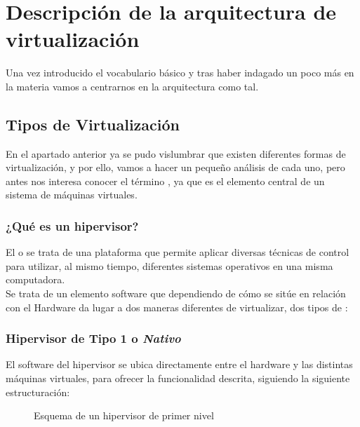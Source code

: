 \chapter[Descripción de la arquitectura]{Descripción de la arquitectura de virtualización}

\lettrine[lines=1,slope=4pt,findent=0pt]{U}{}na vez introducido el vocabulario básico y tras haber indagado un poco más en la materia vamos a centrarnos en la arquitectura como tal.\\

\section{Tipos de Virtualización}\label{tiposvir}
En el apartado anterior ya se pudo vislumbrar que existen diferentes formas de virtualización, y por ello, vamos a hacer un pequeño análisis de cada uno, pero antes nos interesa conocer el término \emph{}, ya que es el elemento central de un sistema de máquinas virtuales.

\subsection{¿Qué es un hipervisor?}
El \emph{} o \emph{} se trata de una plataforma que permite aplicar diversas técnicas de control para utilizar, al mismo tiempo, diferentes sistemas operativos en una misma computadora.\\

Se trata de un elemento software que dependiendo de cómo se sitúe en relación con el Hardware da lugar a dos maneras diferentes de virtualizar, dos tipos de \emph{}\cite{tipoship}:

\subsection{Hipervisor de Tipo 1 o \emph{Nativo}}\label{tiposvir1}
 El software del hipervisor se ubica directamente entre el hardware y las distintas máquinas virtuales, para ofrecer la funcionalidad descrita, siguiendo la siguiente estructuración:

\begin{figure}[H]
\begin{center}
\end{center}
\caption[Hipervisor Tipo 1]{Esquema de un hipervisor de primer nivel}
\end{figure}

